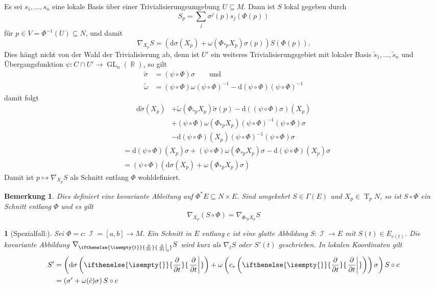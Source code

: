 \documentclass[paper=A4, twoside, chapterprefix=true, bibliography=totoc, headsepline]{scrbook}
\DeclareMathOperator{\R}{\mathbb{R}}
\DeclareMathOperator{\calI}{\mathcal{I}}
\DeclareMathOperator{\GL}{GL}       %
\DeclareMathOperator{\T}{T}         %
\newcommand{\dop}{\mathrm{d}}
\newcommand{\X}{\times}
\newcommand{\pdifffrac}[3][]{\ifthenelse{\isempty{#1}}{\frac{\partial #2}{\partial #3}}{\left. \frac{\partial #2}{\partial #3} \right|_{#1}}}
\theoremstyle{plain}
\theoremstyle{nonumberplain}
\newtheorem{bem}{Bemerkung}
\theoremstyle{empty}
\newtheorem{emptythm}{}%
\theoremstyle{break}
\begin{document}
Es sei $s_1,\ldots ,s_n$ eine lokale Basis \"uber einer Trivialisierungsumgebung $U \subseteq M$. Dann ist $S$ lokal gegeben durch
\[ S_p = \sum_j \sigma^j(p) s_j(\Phi(p)) \]
f\"ur $p \in V = \Phi^{-1}(U) \subseteq N$, und damit
\[ \nabla_{X_p}S = \left( \dop \sigma(X_p) + \omega(\Phi_{*p}X_p) \sigma(p) \right) S(\Phi(p)).\]
Dies h\"angt nicht von der Wahl der Trivialisierung ab, denn ist $U'$ ein weiteres Trivialisierungsgebiet mit lokaler Basis $\tilde s_1, \ldots , \tilde s_n$ und \"Ubergangsfunktion $\psi: C \cap U' \to \GL_n(\R)$, so gilt
\begin{align*}
  \tilde\sigma &= (\psi \circ \Phi) \sigma \qquad \text{und}\\
  \tilde\omega &= (\psi \circ \Phi) \omega(\psi \circ \Phi)^{-1} - \dop (\psi \circ \Phi)(\psi \circ \Phi)^{-1}
\end{align*}
damit folgt
\begin{align*}
  \dop \tilde\sigma(X_p) &+ \tilde\omega(\Phi_{*p}X_p) \tilde\sigma(p) - \dop((\psi \circ \Phi)\sigma) (X_p)\\
  &+ (\psi \circ \Phi) \omega (\Phi_{*p}X_p)(\psi \circ \Phi)^{-1}(\psi \circ \Phi)\sigma\\
  &- \dop(\psi \circ \Phi)(X_p)(\psi \circ \Phi)^{-1}(\psi \circ \Phi)\sigma
\end{align*}\begin{align*}
  &= \dop(\psi \circ \Phi)(X_p)\sigma + (\psi \circ \Phi)\omega(\Phi_{*p}X_p)\sigma - \dop(\psi \circ \Phi)(X_p)\sigma\\
  &= (\psi \circ \Phi)(\dop\sigma(X_p) + \omega(\Phi_{*p}X_p)\sigma)
\end{align*}
Damit ist $p \mapsto \nabla_{X_p}S$ als Schnitt entlang $\Phi$ wohldefiniert.
\begin{bem}
  Dies definiert eine kovariante Ableitung auf $\Phi^*E \subseteq N \X E$.
  Sind umgekehrt $S \in \Gamma(E)$ und $X_p \in \T_pN$, so ist $S \circ \Phi$ ein Schnitt entlang $\Phi$ und es gilt
  \[ \nabla_{X_p}(S \circ \Phi) = \nabla_{\Phi_{*p}X_p}S \]
\end{bem}

\begin{emptythm}[Spezialfall:]
  Sei $\Phi = c : \calI = [a,b] \to M$.
  Ein Schnitt in $E$ entlang $c$ ist eine glatte Abbildung $S: \calI \to E$ mit $S(t) \in E_{c(t)}$.
  Die kovariante Abbildung $\nabla_{\pdifffrac[t]{}{t}} S$ wird kurz als $\nabla_tS$ oder $S'(t)$ geschrieben.
  In lokalen Koordinaten gilt
  \begin{align*}
    S' &= \left( \dop \sigma \left( \pdifffrac{}{t} \right) + \omega\left( c_* \left( \pdifffrac{}{t} \right) \right) \sigma \right) S \circ c\\
    &= \left( \sigma' + \omega(\dot c) \sigma \right) S \circ c
  \end{align*}
\end{emptythm}
\end{document}
